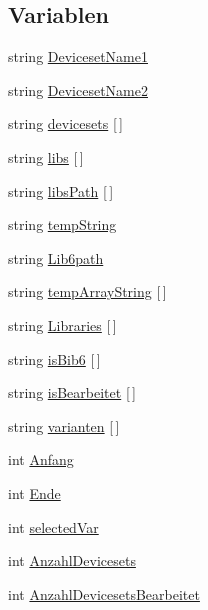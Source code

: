 \subsection*{Variablen}
\begin{DoxyCompactItemize}
\item 
string \hyperlink{uebersicht_8ulp_ace122ab557d48a00848421b69e1c04f1}{Deviceset\+Name1}
\item 
string \hyperlink{uebersicht_8ulp_aa1cefee1a82db8a61d293a0fd1b3e9eb}{Deviceset\+Name2}
\item 
string \hyperlink{uebersicht_8ulp_a3c2db7b0549d69977226cb078c693adc}{devicesets} \mbox{[}$\,$\mbox{]}
\item 
string \hyperlink{uebersicht_8ulp_a82d5ba0c005e6ff309408fd1ce58c589}{libs} \mbox{[}$\,$\mbox{]}
\item 
string \hyperlink{uebersicht_8ulp_ab50ee1dbefcf5a146f47b47945acaf6b}{libs\+Path} \mbox{[}$\,$\mbox{]}
\item 
string \hyperlink{uebersicht_8ulp_a06150de8aca4a33d4ff39693f2bf401d}{temp\+String}
\item 
string \hyperlink{uebersicht_8ulp_a97d250e022f542a08d669ed5973df53e}{Lib6path}
\item 
string \hyperlink{uebersicht_8ulp_a66a5840a967c878c8e5e92faa50960b7}{temp\+Array\+String} \mbox{[}$\,$\mbox{]}
\item 
string \hyperlink{uebersicht_8ulp_ac94a9aaf064a212f836473b5727f8113}{Libraries} \mbox{[}$\,$\mbox{]}
\item 
string \hyperlink{uebersicht_8ulp_a27725d3ac23a3dc038926bed555fddab}{is\+Bib6} \mbox{[}$\,$\mbox{]}
\item 
string \hyperlink{uebersicht_8ulp_a453e4761a92f7a8c4a625504ab144252}{is\+Bearbeitet} \mbox{[}$\,$\mbox{]}
\item 
string \hyperlink{uebersicht_8ulp_aa9e90938c87487c95afbb137be5ff83d}{varianten} \mbox{[}$\,$\mbox{]}
\item 
int \hyperlink{uebersicht_8ulp_a13a0200dc87aebb12ae2167c234b7c6f}{Anfang}
\item 
int \hyperlink{uebersicht_8ulp_a0d22d412dec2a1371e015794097a5d98}{Ende}
\item 
int \hyperlink{uebersicht_8ulp_aa69b6cb226fe16181283ae71f98447ee}{selected\+Var}
\item 
int \hyperlink{uebersicht_8ulp_ac2b0c6498875719653c0747f908e8ae1}{Anzahl\+Devicesets}
\item 
int \hyperlink{uebersicht_8ulp_a9d31a68bb00cc82f4c0dcc3932c7a9da}{Anzahl\+Devicesets\+Bearbeitet}
\end{DoxyCompactItemize}


